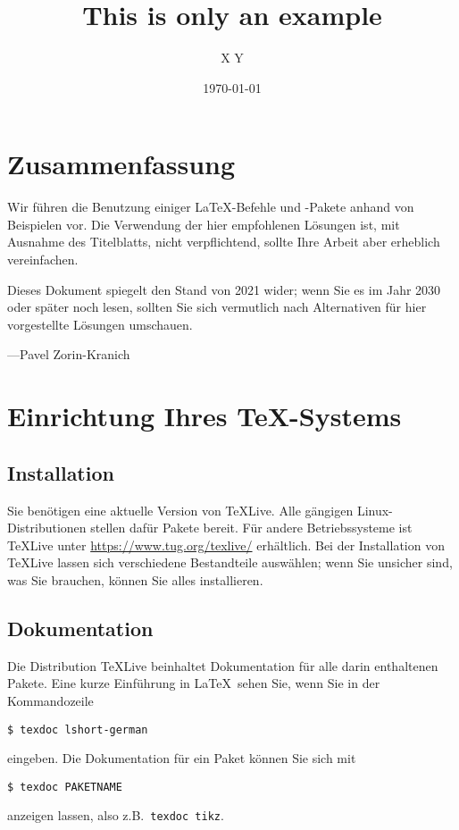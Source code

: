 \documentclass[11pt, a4paper, german]{article}
\author{X Y}
\date{\today}
\title{This is only an example}
\theoremstyle{plain}
\theoremstyle{remark}
\theoremstyle{definition}
\numberwithin{equation}{section}
\numberwithin{theorem}{section}
\begin{document}
\maketitle

\section*{Zusammenfassung}
Wir führen die Benutzung einiger \LaTeX-Befehle und -Pakete anhand von Beispielen vor.
Die Verwendung der hier empfohlenen Lösungen ist, mit Ausnahme des Titelblatts, nicht verpflichtend, sollte Ihre Arbeit aber erheblich vereinfachen.

Dieses Dokument spiegelt den Stand von 2021 wider; wenn Sie es im Jahr 2030 oder später noch lesen, sollten Sie sich vermutlich nach Alternativen für hier vorgestellte Lösungen umschauen.

\begin{flushright}
---Pavel Zorin-Kranich
\end{flushright}

\clearpage
\tableofcontents

\clearpage
\section{Einrichtung Ihres \TeX-Systems}
\subsection{Installation}
Sie benötigen eine aktuelle Version von \TeX Live.
Alle gängigen Linux-Distri\-bu\-ti\-onen stellen dafür Pakete bereit.
Für andere Betriebssysteme ist \TeX Live unter
\url{https://www.tug.org/texlive/}
erhältlich.
Bei der Installation von \TeX Live lassen sich verschiedene Bestandteile auswählen; wenn Sie unsicher sind, was Sie brauchen, können Sie alles installieren.

\subsection{Dokumentation}
Die Distribution \TeX Live beinhaltet Dokumentation für alle darin enthaltenen Pakete.
Eine kurze Einführung in \LaTeX\ sehen Sie, wenn Sie in der Kommandozeile
\begin{verbatim}
$ texdoc lshort-german
\end{verbatim}
eingeben.
Die Dokumentation für ein Paket können Sie sich mit
\begin{verbatim}
$ texdoc PAKETNAME
\end{verbatim}
anzeigen lassen, also z.B.\ \verb|texdoc tikz|.
\end{document}
